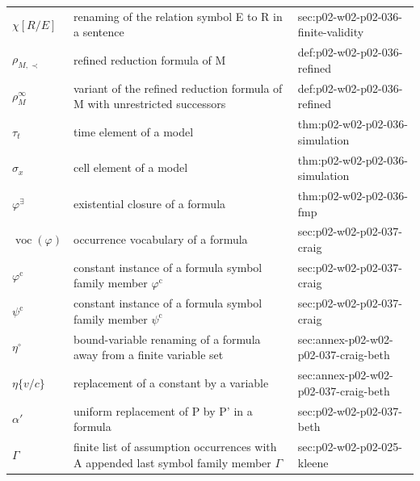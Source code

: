 \begin{longtable}{@{}p{}p{}p{}@{}}
\(\chi[R/E]\) & renaming of the relation symbol E to R in a sentence & sec:\allowbreak{}p02-\allowbreak{}w02-\allowbreak{}p02-\allowbreak{}036-\allowbreak{}finite-\allowbreak{}validity \\
\(\rho_{M,\prec}\) & refined reduction formula of M & def:\allowbreak{}p02-\allowbreak{}w02-\allowbreak{}p02-\allowbreak{}036-\allowbreak{}refined \\
\(\rho^{\infty}_M\) & variant of the refined reduction formula of M with unrestricted successors & def:\allowbreak{}p02-\allowbreak{}w02-\allowbreak{}p02-\allowbreak{}036-\allowbreak{}refined \\
\(\tau_t\) & time element of a model & thm:\allowbreak{}p02-\allowbreak{}w02-\allowbreak{}p02-\allowbreak{}036-\allowbreak{}simulation \\
\(\sigma_x\) & cell element of a model & thm:\allowbreak{}p02-\allowbreak{}w02-\allowbreak{}p02-\allowbreak{}036-\allowbreak{}simulation \\
\(\varphi^{\exists}\) & existential closure of a formula & thm:\allowbreak{}p02-\allowbreak{}w02-\allowbreak{}p02-\allowbreak{}036-\allowbreak{}fmp \\
\(\operatorname{voc}(\varphi)\) & occurrence vocabulary of a formula & sec:\allowbreak{}p02-\allowbreak{}w02-\allowbreak{}p02-\allowbreak{}037-\allowbreak{}craig \\
\(\varphi^{\mathrm{c}}\) & constant instance of a formula symbol family member \(\varphi^{\mathrm{c}}\) & sec:\allowbreak{}p02-\allowbreak{}w02-\allowbreak{}p02-\allowbreak{}037-\allowbreak{}craig \\
\(\psi^{\mathrm{c}}\) & constant instance of a formula symbol family member \(\psi^{\mathrm{c}}\) & sec:\allowbreak{}p02-\allowbreak{}w02-\allowbreak{}p02-\allowbreak{}037-\allowbreak{}craig \\
\(\eta^{\circ}\) & bound-variable renaming of a formula away from a finite variable set & sec:\allowbreak{}annex-\allowbreak{}p02-\allowbreak{}w02-\allowbreak{}p02-\allowbreak{}037-\allowbreak{}craig-\allowbreak{}beth \\
\(\eta\{v/c\}\) & replacement of a constant by a variable & sec:\allowbreak{}annex-\allowbreak{}p02-\allowbreak{}w02-\allowbreak{}p02-\allowbreak{}037-\allowbreak{}craig-\allowbreak{}beth \\
\(\alpha'\) & uniform replacement of P by P' in a formula & sec:\allowbreak{}p02-\allowbreak{}w02-\allowbreak{}p02-\allowbreak{}037-\allowbreak{}beth \\
\(\Gamma\) & finite list of assumption occurrences with A appended last symbol family member \(\Gamma\) & sec:\allowbreak{}p02-\allowbreak{}w02-\allowbreak{}p02-\allowbreak{}025-\allowbreak{}kleene \\

\end{longtable}
